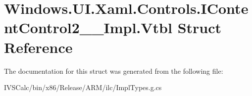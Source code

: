 \hypertarget{struct_windows_1_1_u_i_1_1_xaml_1_1_controls_1_1_i_content_control2_____impl_1_1_vtbl}{}\section{Windows.\+U\+I.\+Xaml.\+Controls.\+I\+Content\+Control2\+\_\+\+\_\+\+Impl.\+Vtbl Struct Reference}
\label{struct_windows_1_1_u_i_1_1_xaml_1_1_controls_1_1_i_content_control2_____impl_1_1_vtbl}


The documentation for this struct was generated from the following file\+:\begin{DoxyCompactItemize}
\item 
I\+V\+S\+Calc/bin/x86/\+Release/\+A\+R\+M/ilc/Impl\+Types.\+g.\+cs\end{DoxyCompactItemize}
